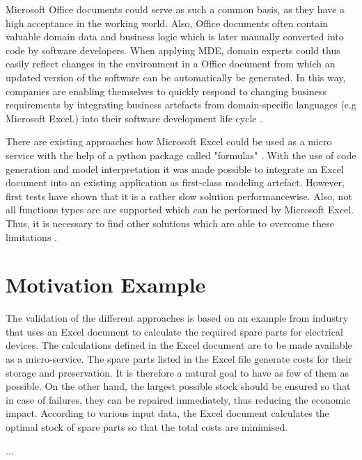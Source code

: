 Microsoft Office documents could serve as such a common basis, as they have a high acceptance in the working world. Also, Office documents often contain valuable domain data and business logic which is later manually converted into code by software developers. When applying MDE, domain experts could thus easily reflect changes in the environment in a Office document from which an updated version of the software can be automatically be generated.  In this way, companies are enabling themselves to quickly respond to changing business requirements by integrating business artefacts from domain-specific languages (e.g Microsoft Excel.) into their software development life cycle \cite{BBA}.

There are existing approaches how Microsoft Excel could be used as a micro service with the help of a python package called "formulas" \cite{BBA}. With the use of code generation and model interpretation it was made possible to integrate an Excel document into an existing application as first-class modeling artefact.
However, first tests have shown that it is a rather slow solution performancewise. Also, not all functions types are are supported which can be performed by Microsoft Excel. Thus, it is necessary to find other solutions which are able to overcome these limitations \cite{BBA}. 






\section{Motivation Example}

The validation of the different approaches is based on an example from industry that uses an Excel document to calculate the required spare parts for electrical devices. The calculations defined in the Excel document are to be made available as a micro-service. 
The spare parts listed in the Excel file generate costs for their storage and preservation. It is therefore a natural goal to have as few of them as possible. On the other hand, the largest possible stock should be ensured so that in case of failures, they can be repaired immediately, thus reducing the economic impact. According to various input data, the Excel document calculates the optimal stock of spare parts so that the total costs are minimised.

...

